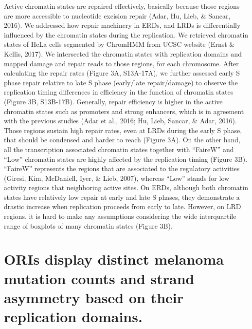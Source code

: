 Active chromatin states are repaired effectively, basically because those regions are more accessible to nucleotide excision repair (Adar, Hu, Lieb, \& Sancar, 2016). We addressed how repair machinery in ERDs, and LRDs is differentially influenced by the chromatin states during the replication. We retrieved chromatin states of HeLa cells segmented by ChromHMM from UCSC website (Ernst \& Kellis, 2017). We intersected the chromatin states with replication domains and mapped damage and repair reads to those regions, for each chromosome. After calculating the repair rates (Figure 3A, S13A-17A), we further assessed early S phase repair relative to late S phase (early/late repair/damage) to observe the replication timing differences in efficiency in the function of chromatin states (Figure 3B, S13B-17B). Generally, repair efficiency is higher in the active chromatin states such as promoters and strong enhancers, which is in agreement with the previous studies (Adar et al., 2016; Hu, Lieb, Sancar, \& Adar, 2016). Those regions sustain high repair rates, even at LRDs during the early S phase, that should be condensed and harder to reach (Figure 3A). On the other hand, all the transcription associated chromatin states together with “FaireW” and “Low” chromatin states are highly affected by the replication timing (Figure 3B). “FaireW” represents the regions that are associated to the regulatory activities (Giresi, Kim, McDaniell, Iyer, \& Lieb, 2007), whereas “Low” stands for low activity regions that neighboring active sites. On ERDs, although both chromatin states have relatively low repair at early and late S phases, they demonstrate a drastic increase when replication proceeds from early to late.  However, on LRD regions, it is hard to make any assumptions considering the wide interquartile range of boxplots of many chromatin states (Figure 3B).

\section{ORIs display distinct melanoma mutation counts and strand asymmetry based on their replication domains.}

